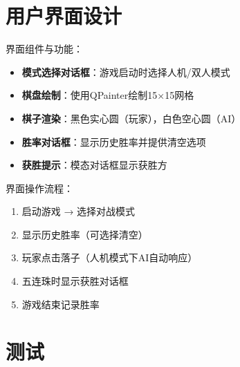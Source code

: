 \documentclass[UTF8]{ctexart}
\begin{document}
\section{用户界面设计}
界面组件与功能：
\begin{itemize}
    \item \textbf{模式选择对话框}：游戏启动时选择人机/双人模式
    \item \textbf{棋盘绘制}：使用QPainter绘制15×15网格
    \item \textbf{棋子渲染}：黑色实心圆（玩家），白色空心圆（AI）
    \item \textbf{胜率对话框}：显示历史胜率并提供清空选项
    \item \textbf{获胜提示}：模态对话框显示获胜方
\end{itemize}

界面操作流程：
\begin{enumerate}
    \item 启动游戏 → 选择对战模式
    \item 显示历史胜率（可选择清空）
    \item 玩家点击落子（人机模式下AI自动响应）
    \item 五连珠时显示获胜对话框
    \item 游戏结束记录胜率
\end{enumerate}
\section{测试}
\end{document}
